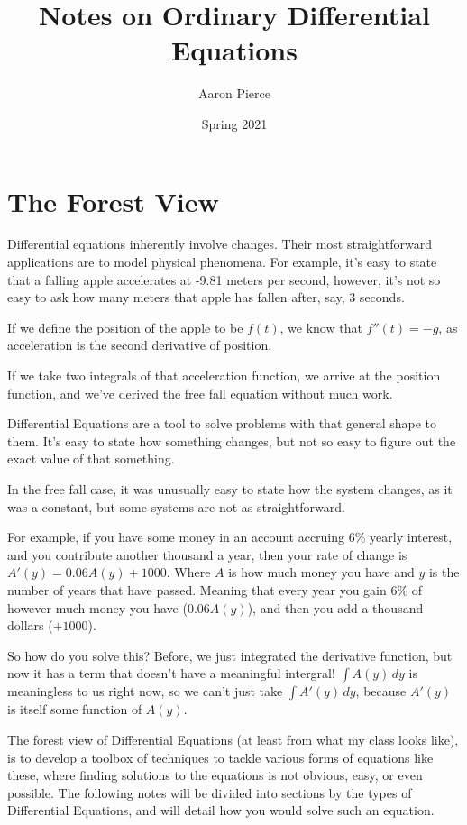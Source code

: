 \documentclass[12pt, letterpaper]{article}
\title{Notes on Ordinary Differential Equations}
\author{Aaron Pierce}
\date{Spring 2021} %
\begin{document}
\maketitle

\tableofcontents

\newpage

\section{The Forest View}
Differential equations inherently involve changes.
Their most straightforward applications are to model physical phenomena. 
For example, it's easy to state that a falling apple accelerates at -9.81 meters per second,
however, it's not so easy to ask how many meters that apple has fallen after, say, 3 seconds.

If we define the position of the apple to be $f(t)$, we know that $f''(t) = -g$,
as acceleration is the second derivative of position.

If we take two integrals of that acceleration function, we arrive at the position function,
and we've derived the free fall equation without much work.

Differential Equations are a tool to solve problems with that general shape to them.
It's easy to state how something changes, but not so easy to figure out the exact
value of that something.

In the free fall case, it was unusually easy to state how the system changes, as it was a constant,
but some systems are not as straightforward.

For example, if you have some money in an account accruing 6\% yearly interest,
and you contribute another thousand a year,
then your rate of change is $A'(y) = 0.06A(y) + 1000$.
Where $A$ is how much money you have and $y$ is the number of years that have passed.
Meaning that every year you gain 6\% of however much money you have ($0.06A(y)$),
and then you add a thousand dollars ($+1000$).

So how do you solve this?
Before, we just integrated the derivative function, but now it has
a term that doesn't have a meaningful intergral! $\int A(y) \, dy$ is meaningless to us right now,
so we can't just take $\int A'(y) \, dy$, because $A'(y)$ is itself some function of $A(y)$.

The forest view of Differential Equations (at least from what my class looks like), is to
develop a toolbox of techniques to tackle various forms of equations like these, where
finding solutions to the equations is not obvious, easy, or even possible.
The following notes will be divided into sections by the types of Differential Equations,
and will detail how you would solve such an equation.
\end{document}
